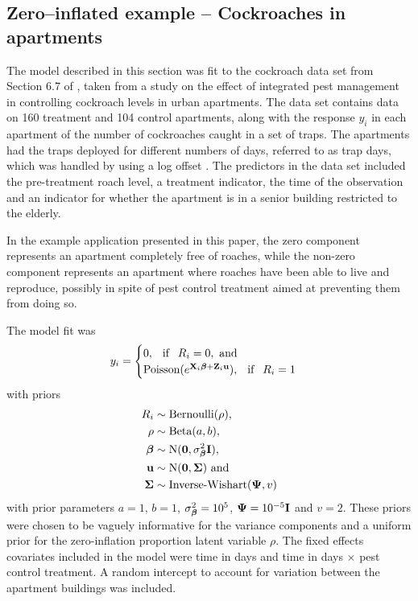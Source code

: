 \subsection{Zero--inflated example -- Cockroaches in apartments}
\label{sec:cockroaches} The model described in this section was fit  to the
cockroach data set from Section 6.7 of \cite{Gelman2007}, taken from a study on
the effect of integrated pest management in controlling cockroach levels in
urban apartments. The data set contains data on 160 treatment and 104 control
apartments, along with the response $y_i$ in each apartment of the number of
cockroaches caught in a set of traps. The apartments had the traps deployed for
different numbers of days, referred to as trap days, which was handled by using
a log offset \cite{Agresti2002}. The predictors in the data set included the
pre-treatment roach level, a treatment indicator, the time of the observation
and an indicator for whether the apartment is in a senior building restricted
to the elderly.
		
In the example application presented in this paper, the zero component
represents an apartment completely free of roaches, while the non-zero
component represents an apartment where roaches have been able to live and
reproduce, possibly in spite of pest control treatment aimed at preventing them
from doing so.

The model fit was
$$
	y_i = \begin{cases}
	0, \phantom{-} \text{if} \phantom{-} R_i = 0, \text{ and } \\
	\text{Poisson}(e^{{\bf X}_i {\boldsymbol \beta} + {\bf Z}_i {\bf u}}), \phantom{-} \text{if} \phantom{-} R_i = 1
	\end{cases}
$$
with priors
\begin{align*}
	R_i &\sim \text{Bernoulli}(\rho), \\
	\rho &\sim \text{Beta}(a, b), \quad\\
	{\boldsymbol \beta} &\sim \text{N}({\bf 0}, \sigma^2_{\boldsymbol \beta} {\bf I}), \\
	{\bf u} &\sim \text{N}({\bf 0}, {\boldsymbol \Sigma}) \text{ and } \\
	{\boldsymbol \Sigma} &\sim \text{Inverse-Wishart}({\boldsymbol \Psi}, v)
\end{align*}
with prior parameters $a = 1$, $b = 1$, $\sigma^2_{\boldsymbol \beta} = 10^5$, ${\boldsymbol \Psi} =
10^{-5} {\bf I}$ and $v = 2$.  These priors were chosen to be vaguely informative
for the variance components and a uniform prior for the zero-inflation
proportion latent variable $\rho$. The fixed effects covariates included in the
model were time in days and time in days $\times$ pest control treatment. A
random intercept to account for variation between the apartment buildings was
included.
		
